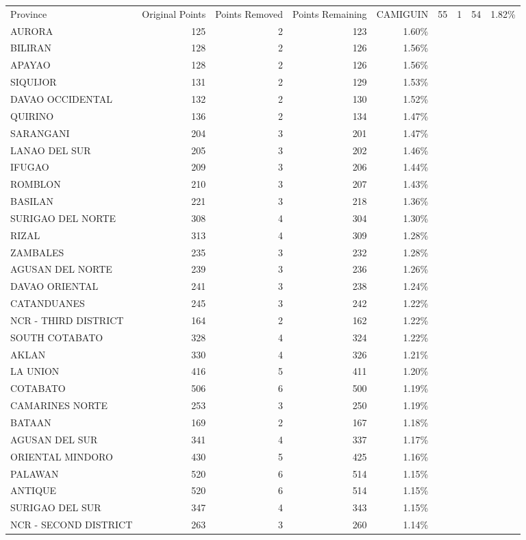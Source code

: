 \begin{tabular}{lrrrr}
\toprule
Province & Original Points & Points Removed & Points Remaining & %
\midrule
CAMIGUIN & 55 & 1 & 54 & 1.82\% \\
AURORA & 125 & 2 & 123 & 1.60\% \\
BILIRAN & 128 & 2 & 126 & 1.56\% \\
APAYAO & 128 & 2 & 126 & 1.56\% \\
SIQUIJOR & 131 & 2 & 129 & 1.53\% \\
DAVAO OCCIDENTAL & 132 & 2 & 130 & 1.52\% \\
QUIRINO & 136 & 2 & 134 & 1.47\% \\
SARANGANI & 204 & 3 & 201 & 1.47\% \\
LANAO DEL SUR & 205 & 3 & 202 & 1.46\% \\
IFUGAO & 209 & 3 & 206 & 1.44\% \\
ROMBLON & 210 & 3 & 207 & 1.43\% \\
BASILAN & 221 & 3 & 218 & 1.36\% \\
SURIGAO DEL NORTE & 308 & 4 & 304 & 1.30\% \\
RIZAL & 313 & 4 & 309 & 1.28\% \\
ZAMBALES & 235 & 3 & 232 & 1.28\% \\
AGUSAN DEL NORTE & 239 & 3 & 236 & 1.26\% \\
DAVAO ORIENTAL & 241 & 3 & 238 & 1.24\% \\
CATANDUANES & 245 & 3 & 242 & 1.22\% \\
NCR - THIRD DISTRICT & 164 & 2 & 162 & 1.22\% \\
SOUTH COTABATO & 328 & 4 & 324 & 1.22\% \\
AKLAN & 330 & 4 & 326 & 1.21\% \\
LA UNION & 416 & 5 & 411 & 1.20\% \\
COTABATO & 506 & 6 & 500 & 1.19\% \\
CAMARINES NORTE & 253 & 3 & 250 & 1.19\% \\
BATAAN & 169 & 2 & 167 & 1.18\% \\
AGUSAN DEL SUR & 341 & 4 & 337 & 1.17\% \\
ORIENTAL MINDORO & 430 & 5 & 425 & 1.16\% \\
PALAWAN & 520 & 6 & 514 & 1.15\% \\
ANTIQUE & 520 & 6 & 514 & 1.15\% \\
SURIGAO DEL SUR & 347 & 4 & 343 & 1.15\% \\
NCR - SECOND DISTRICT & 263 & 3 & 260 & 1.14\% \\

\end{tabular}
